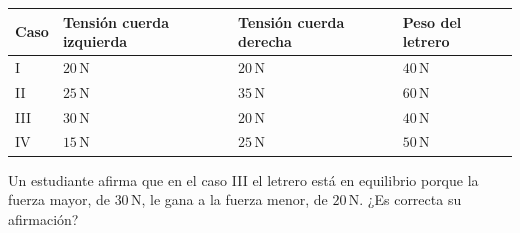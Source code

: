 \documentclass[
  spanish,
  letterpaper,
  12pt,
  oneside,
  open=any,
  DIV=15]{scrbook}
\newcounter{none} %
\begin{document}
{\def\LTcaptype{none} %
\begin{longtable}[]{@{}
  >{\raggedright\arraybackslash}p{}
  >{\raggedright\arraybackslash}p{}
  >{\raggedright\arraybackslash}p{}
  >{\raggedright\arraybackslash}p{}@{}}
\toprule\noalign{}
\begin{minipage}[b]{\linewidth}\raggedright
Caso
\end{minipage} & \begin{minipage}[b]{\linewidth}\raggedright
Tensión cuerda izquierda
\end{minipage} & \begin{minipage}[b]{\linewidth}\raggedright
Tensión cuerda derecha
\end{minipage} & \begin{minipage}[b]{\linewidth}\raggedright
Peso del letrero
\end{minipage} \\
\midrule\noalign{}
\endhead
\bottomrule\noalign{}
\endlastfoot
I & \(20\,\text{N}\) & \(20\,\text{N}\) & \(40\,\text{N}\) \\
II & \(25\,\text{N}\) & \(35\,\text{N}\) & \(60\,\text{N}\) \\
III & \(30\,\text{N}\) & \(20\,\text{N}\) & \(40\,\text{N}\) \\
IV & \(15\,\text{N}\) & \(25\,\text{N}\) & \(50\,\text{N}\) \\
\end{longtable}
}

Un estudiante afirma que en el caso III el letrero está en equilibrio
porque la fuerza mayor, de \(30\,\text{N}\), le gana a la fuerza menor,
de \(20\,\text{N}\). ¿Es correcta su afirmación?
\end{document}
